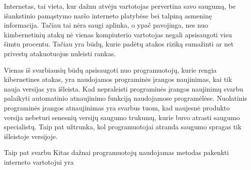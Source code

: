 Internetas, tai vieta, kur dažnu atvėju vartotojas pervertina savo saugumą, be išankstinio pamąstymo naršo interneto platybėse bei talpiną asmeninę informacija. Tačiau tai nėra saugi aplinka, o ypač pavojinga, nes nuo kimbernetinių atakų nė vienas kompiuterio vartotojas negali apsisaugoti visu šimtu procentu. Tačiau yra būdų, kurie padėtų atakos riziką sumažinti ar net privestų atakuotuojus nuleisti rankas.

Vienas iš svarbiausių būdų apsisaugoti nuo programuotojų, kurie rengia kibernetines atakas, yra naudojamos programinės įrangos naujinimas, kai tik nauja versijas yra išleista. Kad nepraleisti programinės įrangos naujinimų svarbu palaikyti automatinio atnaujinimo funkciją naudojamose programėlėse. Nuolatinis programinės įrangos atnaujinimas yra svarbus tuom, kad naujesnė produkto versija nebeturi senesnių versijų saugumo trukumų, kurie buvo atrasti saugumo specialistų. Taip pat užtrunka, kol programuotojai atranda saugumo spragas tik išleistoje versijoje.

Taip pat svarbu
Kitas dažnai programuotojų naudojamas metodas pakenkti interneto vartotojui yra 